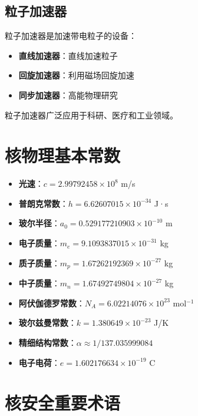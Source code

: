 \documentclass[12pt,UTF8]{ctexbook}
\begin{document}
\section{粒子加速器}

粒子加速器是加速带电粒子的设备：

\begin{itemize}[leftmargin=2cm]
    \item \textbf{直线加速器}：直线加速粒子
    \item \textbf{回旋加速器}：利用磁场回旋加速
    \item \textbf{同步加速器}：高能物理研究
\end{itemize}

粒子加速器广泛应用于科研、医疗和工业领域。

\appendix

\chapter{核物理基本常数}

\begin{itemize}[leftmargin=2cm]
    \item \textbf{光速}：$c = 2.99792458 \times 10^8$ m/s
    \item \textbf{普朗克常数}：$h = 6.62607015 \times 10^{-34}$ J·s
    \item \textbf{玻尔半径}：$a_0 = 0.529177210903 \times 10^{-10}$ m
    \item \textbf{电子质量}：$m_e = 9.1093837015 \times 10^{-31}$ kg
    \item \textbf{质子质量}：$m_p = 1.67262192369 \times 10^{-27}$ kg
    \item \textbf{中子质量}：$m_n = 1.67492749804 \times 10^{-27}$ kg
    \item \textbf{阿伏伽德罗常数}：$N_A = 6.02214076 \times 10^{23}$ mol$^{-1}$
    \item \textbf{玻尔兹曼常数}：$k = 1.380649 \times 10^{-23}$ J/K
    \item \textbf{精细结构常数}：$\alpha \approx 1/137.035999084$
    \item \textbf{电子电荷}：$e = 1.602176634 \times 10^{-19}$ C
\end{itemize}

\chapter{核安全重要术语}
\end{document}
